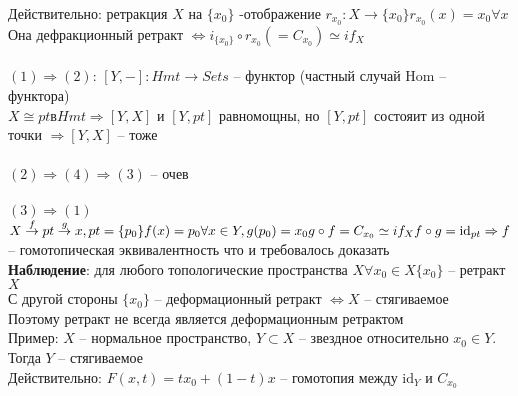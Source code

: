 	Действительно: ретракция $X$ на $\{x_0\}$ -отображение $r_{x_0}: X \rightarrow \{x_0\} r_{x_0} (x) = x_0 \forall x$\\
	Она дефракционный ретракт $\Leftrightarrow i_{\{x_0\}} \circ r_{x_0}( = C_{x_0}) \simeq if_X$\\
	\\
	$(1)\Rightarrow (2)$: $[Y, -]: Hmt \rightarrow Sets$ -- функтор (частный случай $\text{Hom}$ -- функтора)\\
	$X \cong pt в Hmt \Rightarrow [Y,X]$ и $[Y, pt]$ равномощны, но $[Y, pt]$ состояит из одной точки $\Rightarrow [Y,X]$ -- тоже\\
	\\
	$(2) \Rightarrow (4) \Rightarrow (3)$ -- очев\\
	\\
	$(3) \Rightarrow (1)$ $X \overset{f}{\rightarrow} pt \overset{g}{\rightarrow} x, pt = \{p_0\}\\
	f(x) = p_0 \forall x\in Y, g(p_0) = x_0\\
	g \circ f = C_{x_0} \simeq if_X\\
	f \circ g =  \text{id}_{pt}\\
	\Rightarrow f$ -- гомотопическая эквивалентность что и требовалось доказать\\
	\textbf{Наблюдение}: для любого топологические пространства $X \forall x_0 \in X \{x_0\}$ -- ретракт $X$\\
	С другой стороны $\{x_0\}$ -- деформационный ретракт $\Leftrightarrow X$ -- стягиваемое\\
	Поэтому ретракт не всегда является деформационным ретрактом\\
	Пример: $X$ -- нормальное пространство, $Y\subset X$ -- звездное относительно $x_0 \in Y$. Тогда $Y$ -- стягиваемое\\
	Действительно: $F(x,t) = tx_0 + (1-t)x$ -- гомотопия между $ \text{id}_Y$ и $C_{x_0}$
	


\newpage
